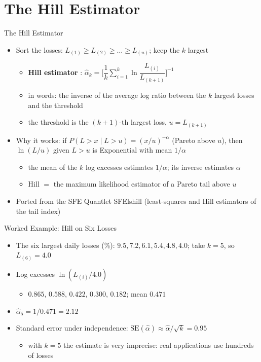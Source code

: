 \section{The Hill Estimator}

\begin{frame}{The Hill Estimator}
\itemsize{\small}
\begin{itemize}
    \item Sort the losses: $L_{(1)} \ge L_{(2)} \ge \dots \ge L_{(n)}$; keep the $k$ largest
    \begin{itemize}
        \item \textbf{Hill estimator} : $\hat\alpha_k = \Big[\dfrac{1}{k}\sum_{i=1}^{k}\ln\dfrac{L_{(i)}}{L_{(k+1)}}\Big]^{-1}$
        \item in words: the inverse of the average log ratio between the $k$ largest losses and the threshold
        \item the threshold is the $(k+1)$-th largest loss, $u = L_{(k+1)}$
    \end{itemize}
    \item Why it works: if $P(L > x \mid L > u) = (x/u)^{-\alpha}$ (Pareto above $u$), then $\ln(L/u)$ given $L > u$ is Exponential with mean $1/\alpha$
    \begin{itemize}
        \item the mean of the $k$ log excesses estimates $1/\alpha$; its inverse estimates $\alpha$
        \item Hill $=$ the maximum likelihood estimator of a Pareto tail above $u$
    \end{itemize}
    \item Ported from the SFE Quantlet SFElshill (least-squares and Hill estimators of the tail index) 
\end{itemize}
\end{frame}

\begin{frame}{Worked Example: Hill on Six Losses}
\itemsize{\small}
\begin{itemize}
    \item The six largest daily losses (\%): $9.5, 7.2, 6.1, 5.4, 4.8, 4.0$; take $k = 5$, so $L_{(6)} = 4.0$
    \item Log excesses $\ln(L_{(i)}/4.0)$
    \begin{itemize}
        \item $0.865$, $0.588$, $0.422$, $0.300$, $0.182$; mean $0.471$
    \end{itemize}
    \item $\hat\alpha_5 = 1/0.471 = 2.12$
    \item Standard error under independence: $\mathrm{SE}(\hat\alpha) \approx \hat\alpha/\sqrt{k} = 0.95$
    \begin{itemize}
        \item with $k = 5$ the estimate is very imprecise: real applications use hundreds of losses
    \end{itemize}
\end{itemize}
\end{frame}

